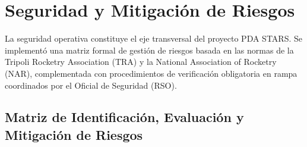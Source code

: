 \section{Seguridad y Mitigación de Riesgos}

La seguridad operativa constituye el eje transversal del proyecto PDA STARS. Se implementó una matriz formal de gestión de riesgos basada en las normas de la Tripoli Rocketry Association (TRA) y la National Association of Rocketry (NAR), complementada con procedimientos de verificación obligatoria en rampa coordinados por el Oficial de Seguridad (RSO).

\subsection{Matriz de Identificación, Evaluación y Mitigación de Riesgos}
